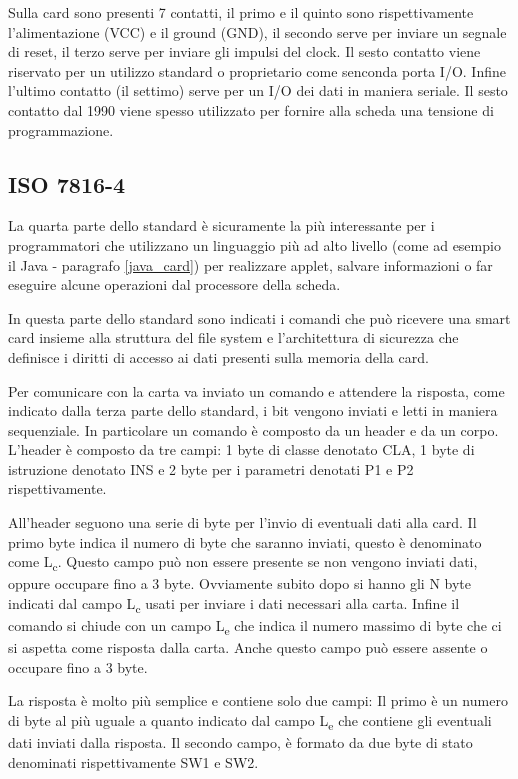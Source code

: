 Sulla card sono presenti 7 contatti, il primo e il quinto sono rispettivamente l'alimentazione (VCC) e il ground (GND), il secondo serve per inviare un segnale di reset, il terzo serve per inviare gli impulsi del clock. Il sesto contatto viene riservato per un utilizzo standard o proprietario come senconda porta I/O. Infine l'ultimo contatto (il settimo) serve per un I/O dei dati in maniera seriale. Il sesto contatto dal 1990 viene spesso utilizzato per fornire alla scheda una tensione di programmazione.
\cite{isoiec3}

\subsection{ISO 7816-4}
La quarta parte dello standard è sicuramente la più interessante per i programmatori che utilizzano un linguaggio più ad alto livello (come ad esempio il Java - paragrafo \ref{java_card}) per realizzare applet, salvare informazioni o far eseguire alcune operazioni dal processore della scheda.

In questa parte dello standard sono indicati i comandi che può ricevere una smart card insieme alla struttura del file system e l'architettura di sicurezza che definisce i diritti di accesso ai dati presenti sulla memoria della card.

Per comunicare con la carta va inviato un comando e attendere la risposta, come indicato dalla terza parte dello standard, i bit vengono inviati e letti in maniera sequenziale. In particolare un comando è composto da un header e da un corpo. L'header è composto da tre campi: 1 byte di classe denotato CLA, 1 byte di istruzione denotato INS e 2 byte per i parametri denotati P1 e P2 rispettivamente.

All'header seguono una serie di byte per l'invio di eventuali dati alla card. Il primo byte indica il numero di byte che saranno inviati, questo è denominato come L\textsubscript{c}. Questo campo può non essere presente se non vengono inviati dati, oppure occupare fino a 3 byte. Ovviamente subito dopo si hanno gli N byte indicati dal campo L\textsubscript{c} usati per inviare i dati necessari alla carta. Infine il comando si chiude con un campo L\textsubscript{e} che indica il numero massimo di byte che ci si aspetta come risposta dalla carta. Anche questo campo può essere assente o occupare fino a 3 byte.

La risposta è molto più semplice e contiene solo due campi: Il primo è un numero di byte al più uguale a quanto indicato dal campo L\textsubscript{e} che contiene gli eventuali dati inviati dalla risposta. Il secondo campo, è formato da due byte di stato denominati rispettivamente SW1 e SW2.

